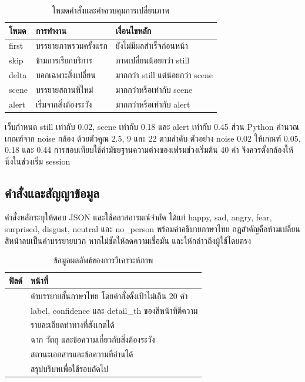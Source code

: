 \begin{table}[H]\centering\caption{โหมดคำสั่งและค่าควบคุมการเปลี่ยนภาพ}
\begin{tabularx}{\linewidth}{lYY}\toprule โหมด & การทำงาน & เงื่อนไขหลัก\\\midrule
first & บรรยายภาพรวมครั้งแรก & ยังไม่มีผลสำเร็จก่อนหน้า\\
skip & ข้ามการเรียกบริการ & ภาพเปลี่ยนน้อยกว่า still\\
delta & บอกเฉพาะสิ่งเปลี่ยน & มากกว่า still แต่น้อยกว่า scene\\
scene & บรรยายสถานที่ใหม่ & มากกว่าหรือเท่ากับ scene\\
alert & เริ่มจากสิ่งต้องระวัง & มากกว่าหรือเท่ากับ alert\\\bottomrule
\end{tabularx}\end{table}

เว็บกำหนด still เท่ากับ 0.02, scene เท่ากับ 0.18 และ alert เท่ากับ 0.45 ส่วน Python คำนวณเกณฑ์จาก noise กล้อง ด้วยตัวคูณ 2.5, 9 และ 22 ตามลำดับ ตัวอย่าง noise 0.02 ให้เกณฑ์ 0.05, 0.18 และ 0.44 การสอบเทียบใช้ค่ามัธยฐานความต่างของเฟรมช่วงเริ่มต้น 40 ค่า จึงควรตั้งกล้องให้นิ่งในช่วงเริ่ม session

\subsection{คำสั่งและสัญญาข้อมูล}
คำสั่งหลักระบุให้ตอบ JSON และใช้คลาสอารมณ์จำกัด ได้แก่ happy, sad, angry, fear, surprised, disgust, neutral และ no\_person พร้อมคำอธิบายภาษาไทย กฎสำคัญคือห้ามเปลี่ยนสีหน้าลบเป็นคำบรรยายบวก หากไม่ชัดให้ลดความเชื่อมั่น และให้กล่าวถึงผู้ใช้โดยตรง

\begin{table}[H]\centering\caption{ข้อมูลผลลัพธ์ของการวิเคราะห์ภาพ}
\begin{tabularx}{\linewidth}{p{46mm}Y}\toprule ฟิลด์ & หน้าที่\\\midrule
{} & คำบรรยายสั้นภาษาไทย โดยคำสั่งตั้งเป้าไม่เกิน 20 คำ\\
 & label, confidence และ detail\_th ของสีหน้าที่ตีความ\\
 & รายละเอียดท่าทางที่สังเกตได้\\
 & ฉาก วัตถุ และข้อความเกี่ยวกับสิ่งต้องระวัง\\
 & สถานะเอกสารและข้อความที่อ่านได้\\
 & สรุปบริบทเพื่อใช้รอบถัดไป\\\bottomrule
\end{tabularx}\end{table}

